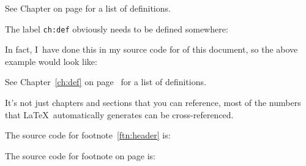 \begin{code}
See Chapter on
page for a list of definitions.
\end{code}
The label \texttt{ch:def} obviously needs to
be defined somewhere:
\begin{code}
\begin{alltt}
\end{alltt}
\end{code}
In fact, I~have done this in my source code for  of this document, so the above example
would look like:
\begin{resultS}
See Chapter~\ref*{ch:def} on
page~\pageref*{ch:def} for a list of definitions.
\end{resultS}

%
It's not just chapters and sections that you can reference, most of
the numbers that \LaTeX\ automatically generates can be
cross-referenced. 

The source code for footnote~\ref{ftn:header}  is:
\begin{code}
\end{code}
\begin{code}
The source code for footnote on
page is:
\end{code}

